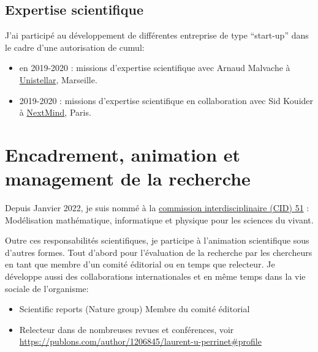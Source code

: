 \documentclass[10pt,french,a4paper,oneside]{article}%
\begin{document}
\subsection{Expertise scientifique} %

J'ai participé au développement de différentes entreprise de type ``start-up'' dans le cadre d'une autorisation de cumul:

\begin{itemize}
	\item en 2019-2020 : missions d'expertise scientifique avec Arnaud Malvache à \href{https://unistellaroptics.com/}{Unistellar}, Marseille.

	\item 2019-2020 : missions d'expertise scientifique en collaboration avec Sid Kouider à \href{https://www.next-mind.com/}{NextMind}, Paris.
\end{itemize}

\section{Encadrement, animation et management de la recherche}


Depuis Janvier 2022, je suis nommé à la \href{https://www.cnrs.fr/comitenational/cid/cid.php?cid=51}{commission interdisciplinaire (CID) 51} : Modélisation mathématique, informatique et physique pour les sciences du vivant.

Outre ces responsabilités scientifiques, je participe à l'animation scientifique sous d'autres formes. Tout d'abord pour l'évaluation de la recherche par les chercheurs en tant que membre d'un comité éditorial ou en temps que relecteur. Je développe aussi des collaborations internationales et en même temps dans la vie sociale de l'organisme:


\begin{itemize}

	\item Scientific reports (Nature group) Membre du comité éditorial

	\item Relecteur dans de nombreuses revues et conférences, voir \url{https://publons.com/author/1206845/laurent-u-perrinet#profile}

\end{itemize}


\printbibliography
\end{document}
